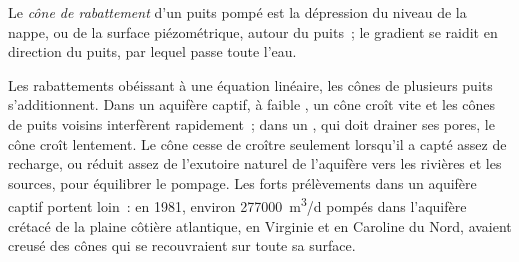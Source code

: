 \begin{definition}\label{def:b3:hydrogeology:cone}
Le \emph{cône de rabattement} d'un puits pompé est
la dépression du niveau de la nappe, ou de la surface piézométrique,
autour du puits~; le gradient se raidit en direction du puits, par lequel
passe toute l'eau.
\end{definition}

Les rabattements obéissant à une équation linéaire, les cônes de plusieurs puits
s'additionnent. Dans un aquifère captif, à faible , un cône
croît vite et les cônes de puits voisins interfèrent rapidement~; dans un , qui doit drainer ses pores, le cône croît lentement. Le cône cesse
de croître seulement lorsqu'il a capté assez de recharge, ou réduit assez de
l'exutoire naturel de l'aquifère vers les rivières et les sources, pour
équilibrer le pompage. Les forts prélèvements dans un aquifère captif portent loin~: en 1981,
environ \qty{277000}{m^3/d} pompés dans l'aquifère crétacé de la plaine côtière
atlantique, en Virginie et en Caroline du Nord, avaient creusé des cônes
qui se recouvraient sur toute sa surface.

